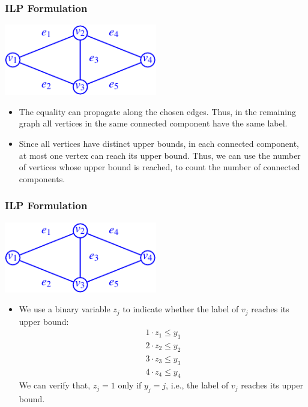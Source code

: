 \frame
{
	\frametitle{ILP Formulation}

	\begin{center}
	\includegraphics[width=0.5\textwidth]{Lec8-Genome-Rearrangement-Problem-figs/example.pdf}
	\end{center}

	\begin{itemize}
	\item<2-> The equality can propagate along the chosen edges. Thus, in the remaining graph
		all vertices in the same connected component have the same label.

	\item<3-> Since all vertices have distinct upper bounds, in each connected
	component, at most one vertex can reach its upper bound. Thus, we
	can use the number of vertices whose upper bound is reached, to count the number of connected components.

	\end{itemize}
}


\frame
{
	\frametitle{ILP Formulation}

	\begin{center}
	\includegraphics[width=0.5\textwidth]{Lec8-Genome-Rearrangement-Problem-figs/example.pdf}
	\end{center}

	\begin{itemize}
	\item<2-> We use a binary variable $z_j$ to indicate whether the label of $v_j$ reaches its upper bound:
		\begin{eqnarray*}
			1 \cdot z_1 \le y_1 \\
			2 \cdot z_2 \le y_2 \\
			3 \cdot z_3 \le y_3 \\
			4 \cdot z_4 \le y_4 
		\end{eqnarray*}
	We can verify that, $z_j = 1$ only if $y_j = j$, i.e., the label of $v_j$ reaches its upper bound.
	\end{itemize}
}


